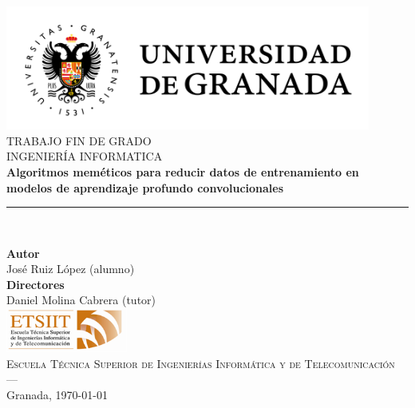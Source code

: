 
\begin{titlepage}


    \newlength{\centeroffset}
    \setlength{\centeroffset}{-0.5\oddsidemargin}
    \addtolength{\centeroffset}{0.5\evensidemargin}
    \thispagestyle{empty}

    \noindent\hspace*{\centeroffset}\begin{minipage}{\textwidth}

        \centering
        \includegraphics[width=0.9\textwidth]{imagenes/logo_ugr.jpg}\\[1.4cm]

        \textsc{ \Large TRABAJO FIN DE GRADO\\[0.2cm]}
        \textsc{ INGENIERÍA INFORMATICA }\\[1cm]
        {\Huge\bfseries Algoritmos meméticos para reducir datos de entrenamiento en modelos de aprendizaje profundo convolucionales\\
        }
        \vspace{0.2cm}
        \noindent\rule[-1ex]{\textwidth}{3pt}\\[3.5ex]

        \vspace{0.4cm}

        \textbf{Autor}\\ {José Ruiz López (alumno)}\\[2.5ex]
        \textbf{Directores}\\
        {Daniel Molina Cabrera (tutor)}\\
        \vspace{0.6cm}
        \includegraphics[width=0.3\textwidth]{imagenes/etsiit_logo.png}\\[0.1cm]
        \textsc{Escuela Técnica Superior de Ingenierías Informática y de Telecomunicación}\\
        \textsc{---}\\
        Granada, \mesanyo\today
    \end{minipage}
\end{titlepage}


